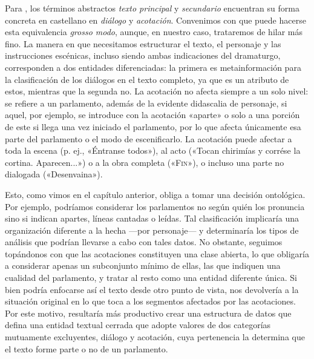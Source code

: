 Para \citeauthor{garcia2020}, los términos abstractos \textit{texto principal} y \textit{secundario} encuentran su forma concreta en castellano en \textit{diálogo} y \textit{acotación}. Convenimos con que puede hacerse esta equivalencia \textit{grosso modo}, aunque, en nuestro caso, trataremos de hilar más fino. La manera en que necesitamos estructurar el texto, el personaje y las instrucciones escénicas, incluso siendo ambas indicaciones del dramaturgo, corresponden a dos entidades diferenciadas: la primera es metainformación para la clasificación de los diálogos en el texto completo, ya que es un atributo de estos, mientras que la segunda no. La acotación no afecta siempre a un solo nivel: se refiere a un parlamento, además de la evidente didascalia de personaje, si aquel, por ejemplo, se introduce con la acotación «aparte» o solo a una porción de este si llega una vez iniciado el parlamento, por lo que afecta únicamente esa parte del parlamento o el modo de escenificarlo. La acotación puede afectar a toda la escena (p. ej., «Éntranse todos»), al acto («Tocan chirimías y corrése la cortina. Aparecen...») o a la obra completa («\textsc{Fin}»), o incluso una parte no dialogada («Desenvaina»).

Esto, como vimos en el capítulo anterior, obliga a tomar una decisión ontológica. Por ejemplo, podríamos considerar los parlamentos no según quién los pronuncia sino si indican apartes, líneas cantadas o leídas. Tal clasificación implicaría una organización  diferente a la hecha —\nolinebreak por personaje\nolinebreak— y determinaría los tipos de análisis que podrían llevarse a cabo con tales datos. No obstante, seguimos topándonos con que las acotaciones constituyen una clase abierta, lo que obligaría a considerar apenas un subconjunto mínimo de ellas, las que indiquen una cualidad del parlamento, y tratar al resto como una entidad diferente única. Si bien podría enfocarse así el texto desde otro punto de vista, nos devolvería a la situación original en lo que toca a los segmentos afectados por las acotaciones. Por este motivo, resultaría más productivo crear una estructura de datos que defina una entidad textual cerrada que adopte valores de dos categorías mutuamente excluyentes, diálogo y acotación, cuya pertenencia la determina que el texto forme parte o no de un parlamento.


